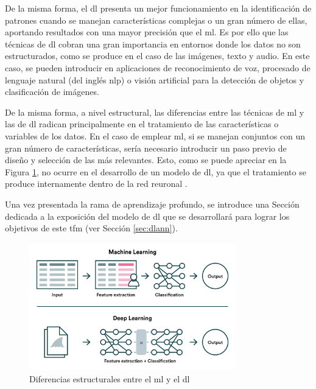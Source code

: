 \vspace{3mm}

De la misma forma, el \gls{dl} presenta un mejor funcionamiento en la identificación de patrones cuando se manejan características complejas o un gran número de ellas, aportando resultados con una mayor precisión que el \gls{ml}. Es por ello que las técnicas de \gls{dl} cobran una gran importancia en entornos donde los datos no son estructurados, como se produce en el caso de las imágenes, texto y audio. En este caso, se pueden introducir en aplicaciones de reconocimiento de voz, procesado de lenguaje natural (del inglés \gls{nlp}) o visión artificial para la detección de objetos y clasificación de imágenes. \cite{iageeks}

\vspace{3mm}

De la misma forma, a nivel estructural, las diferencias entre las técnicas de \gls{ml} y las de \gls{dl} radican principalmente en el tratamiento de las características o variables de los datos. En el caso de emplear \gls{ml}, si se manejan conjuntos con un gran número de características, sería necesario introducir un paso previo de diseño y selección de las más relevantes. Esto, como se puede apreciar en la Figura \ref{fig:features}, no ocurre en el desarrollo de un modelo de \gls{dl}, ya que el tratamiento se produce internamente dentro de la red reuronal \cite{valohai}.

\vspace{3mm}

Una vez presentada la rama de aprendizaje profundo, se introduce una Sección dedicada a la exposición del modelo de \gls{dl} que se desarrollará para lograr los objetivos de este \gls{tfm} (ver Sección \ref{sec:dlann}). 

\vspace{3mm}

\begin{figure}[h!]
    \centering
    \includegraphics[width=0.8\textwidth]{img/teoria/mlvsdl.png}
    \caption{Diferencias estructurales entre el \acrshort{ml} y el \acrshort{dl} \cite{valohai}}
    \label{fig:features}
\end{figure}

